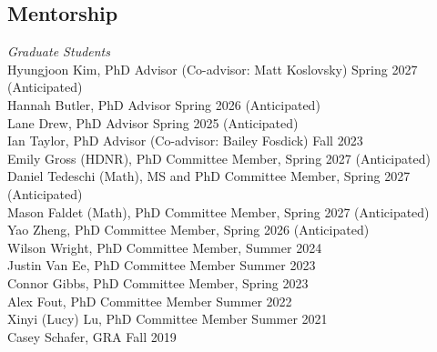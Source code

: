 \documentclass[margin,line]{res}
\begin{document}
\begin{resume}
% 

\section{\sc Mentorship}

{\em Graduate Students} \hfill \\
Hyungjoon Kim, PhD Advisor (Co-advisor: Matt Koslovsky) \hfill Spring 2027 (Anticipated) \\
Hannah Butler, PhD Advisor \hfill Spring 2026 (Anticipated) \\
Lane Drew, PhD Advisor \hfill Spring 2025 (Anticipated) \\
Ian Taylor, PhD Advisor (Co-advisor: Bailey Fosdick) \hfill Fall 2023 \\
Emily Gross (HDNR), PhD Committee Member, \hfill Spring 2027 (Anticipated) \\
Daniel Tedeschi (Math), MS and PhD Committee Member, \hfill Spring 2027 (Anticipated) \\
Mason Faldet (Math), PhD Committee Member, \hfill Spring 2027 (Anticipated) \\
Yao Zheng, PhD Committee Member, \hfill Spring 2026 (Anticipated) \\ 
Wilson Wright, PhD Committee Member, \hfill Summer 2024 \\
Justin Van Ee, PhD Committee Member \hfill Summer 2023 \\
Connor Gibbs, PhD Committee Member, \hfill Spring 2023  \\
Alex Fout, PhD Committee Member \hfill Summer 2022 \\
Xinyi (Lucy) Lu, PhD Committee Member \hfill Summer 2021 \\
Casey Schafer, GRA \hfill Fall 2019 \\




\end{resume}
\end{document}

